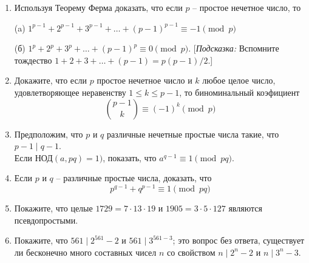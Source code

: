 \documentclass[4apaper,11pt]{article}
\begin{document}
\begin{enumerate}
(а) Если $a^p\equiv b^p\pmod p$, то $a\equiv b\pmod p$.

(б) Если $a^p\equiv b^p\pmod p$, то $a\equiv b\pmod p^2$. [\textsl{Подсказка:} Из пункта (а) $a=b+pk$ для некоторого k, так что $a^p-b^p=(b+pk)^p-b^p$; теперь покажем, что $p^2$ делит последнее выражение]
\item Используя Теорему Ферма доказать, что если $p$ -- простое нечетное число, то

(a) $1^{p-1}+2^{p-1}+3^{p-1}+\dots+(p-1)^{p-1}\equiv -1\pmod p$

(б) $1^p+2^p+3^p+\dots+(p-1)^p\equiv 0 \pmod p$. [\textsl{Подсказка:} Вспомните тождество $1+2+3+\dots+(p-1)=p(p-1)/2$.]
\item Докажите, что если $p$ простое нечетное число и $k$ любое целое число, удовлетворяющее неравенству $1\leq k \leq p-1$, то биноминальный коэфициент \[
\binom{p-1}{k}\equiv (-1)^k\pmod p\] %
\item Предположим, что $p$ и $q$ различные нечетные простые числа такие, что $p-1\mid q-1$.\\ Если $\text{НОД}(a,pq)=1)$, показать, что $a^{q-1}\equiv 1\pmod {pq}$.
\item Если $p$ и $q$ -- различные простые числа, доказать, что 
\[p^{q-1}+q^{p-1}\equiv 1\pmod {pq}\]
\item Покажите, что целые $1729=7\cdot13\cdot19$ и $1905=3\cdot5\cdot127$ являются псевдопростыми.
\item Покажите, что $561\mid 2^{561}-2$ и $561\mid 3^{561-3}$; это вопрос без ответа,
существует ли бесконечно много составных чисел $n$ со свойством $n\mid2^n-2$ и $n\mid 3^n-3$.
\end{enumerate}
\end{document}
